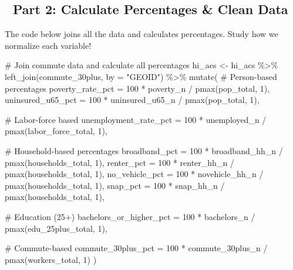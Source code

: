 \documentclass[
  letterpaper,
  DIV=11,
  numbers=noendperiod]{scrartcl}
\newenvironment{Shaded}{\begin{snugshade}}{\end{snugshade}}
\newcommand{\AttributeTok}[1]{\textcolor[rgb]{0.40,0.45,0.13}{#1}}
\newcommand{\CommentTok}[1]{\textcolor[rgb]{0.37,0.37,0.37}{#1}}
\newcommand{\DecValTok}[1]{\textcolor[rgb]{0.68,0.00,0.00}{#1}}
\newcommand{\FunctionTok}[1]{\textcolor[rgb]{0.28,0.35,0.67}{#1}}
\newcommand{\NormalTok}[1]{\textcolor[rgb]{0.00,0.23,0.31}{#1}}
\newcommand{\OtherTok}[1]{\textcolor[rgb]{0.00,0.23,0.31}{#1}}
\newcommand{\SpecialCharTok}[1]{\textcolor[rgb]{0.37,0.37,0.37}{#1}}
\newcommand{\StringTok}[1]{\textcolor[rgb]{0.13,0.47,0.30}{#1}}
\begin{document}
\subsection{🧮 Part 2: Calculate Percentages \& Clean
Data}\label{part-2-calculate-percentages-clean-data}

The code below joins all the data and calculates percentages. Study how
we normalize each variable!

\begin{Shaded}
\begin{Highlighting}[]
\CommentTok{\# Join commute data and calculate all percentages}
\NormalTok{hi\_acs }\OtherTok{\textless{}{-}}\NormalTok{ hi\_acs }\SpecialCharTok{\%\textgreater{}\%}
  \FunctionTok{left\_join}\NormalTok{(commute\_30plus, }\AttributeTok{by =} \StringTok{"GEOID"}\NormalTok{) }\SpecialCharTok{\%\textgreater{}\%}
  \FunctionTok{mutate}\NormalTok{(}
    \CommentTok{\# Person{-}based percentages}
    \AttributeTok{poverty\_rate\_pct        =} \DecValTok{100} \SpecialCharTok{*}\NormalTok{ poverty\_n       }\SpecialCharTok{/} \FunctionTok{pmax}\NormalTok{(pop\_total, }\DecValTok{1}\NormalTok{),}
    \AttributeTok{uninsured\_u65\_pct       =} \DecValTok{100} \SpecialCharTok{*}\NormalTok{ uninsured\_u65\_n }\SpecialCharTok{/} \FunctionTok{pmax}\NormalTok{(pop\_total, }\DecValTok{1}\NormalTok{),}
    
    \CommentTok{\# Labor{-}force based}
    \AttributeTok{unemployment\_rate\_pct   =} \DecValTok{100} \SpecialCharTok{*}\NormalTok{ unemployed\_n    }\SpecialCharTok{/} \FunctionTok{pmax}\NormalTok{(labor\_force\_total, }\DecValTok{1}\NormalTok{),}
    
    \CommentTok{\# Household{-}based percentages}
    \AttributeTok{broadband\_pct           =} \DecValTok{100} \SpecialCharTok{*}\NormalTok{ broadband\_hh\_n  }\SpecialCharTok{/} \FunctionTok{pmax}\NormalTok{(households\_total, }\DecValTok{1}\NormalTok{),}
    \AttributeTok{renter\_pct              =} \DecValTok{100} \SpecialCharTok{*}\NormalTok{ renter\_hh\_n     }\SpecialCharTok{/} \FunctionTok{pmax}\NormalTok{(households\_total, }\DecValTok{1}\NormalTok{),}
    \AttributeTok{no\_vehicle\_pct          =} \DecValTok{100} \SpecialCharTok{*}\NormalTok{ novehicle\_hh\_n  }\SpecialCharTok{/} \FunctionTok{pmax}\NormalTok{(households\_total, }\DecValTok{1}\NormalTok{),}
    \AttributeTok{snap\_pct                =} \DecValTok{100} \SpecialCharTok{*}\NormalTok{ snap\_hh\_n       }\SpecialCharTok{/} \FunctionTok{pmax}\NormalTok{(households\_total, }\DecValTok{1}\NormalTok{),}
    
    \CommentTok{\# Education (25+)}
    \AttributeTok{bachelors\_or\_higher\_pct =} \DecValTok{100} \SpecialCharTok{*}\NormalTok{ bachelors\_n     }\SpecialCharTok{/} \FunctionTok{pmax}\NormalTok{(edu\_25plus\_total, }\DecValTok{1}\NormalTok{),}
    
    \CommentTok{\# Commute{-}based}
    \AttributeTok{commute\_30plus\_pct      =} \DecValTok{100} \SpecialCharTok{*}\NormalTok{ commute\_30plus\_n }\SpecialCharTok{/} \FunctionTok{pmax}\NormalTok{(workers\_total, }\DecValTok{1}\NormalTok{)}
\NormalTok{  )}
\end{Highlighting}
\end{Shaded}
\end{document}
